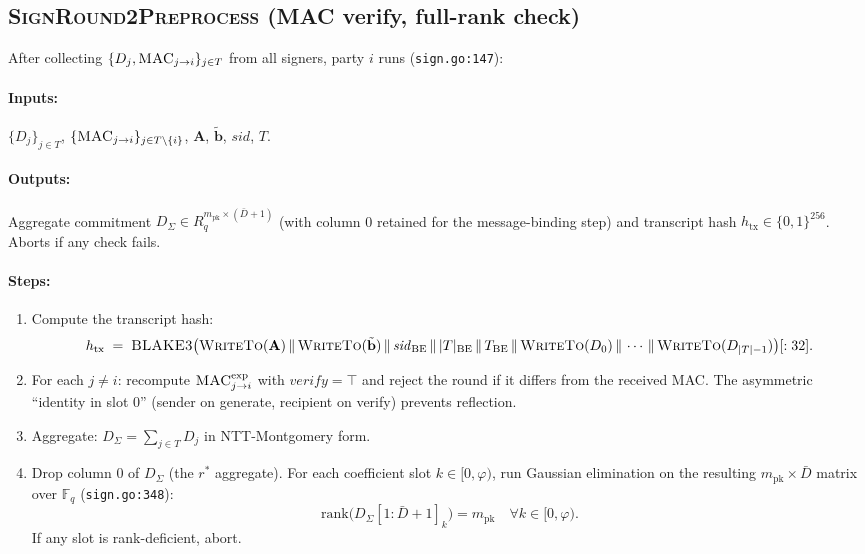 \subsection{\textsc{SignRound2Preprocess} (MAC verify, full-rank check)}
\label{sec:protocol:r2pre}

After collecting $\{D_j, \textsc{MAC}_{j \to i}\}_{j \in T}$ from all
signers, party $i$ runs (\texttt{sign.go:147}):

\paragraph{Inputs:} $\{D_j\}_{j \in T}$, $\{\textsc{MAC}_{j \to i}\}_{j
\in T \setminus \{i\}}$, $\mathbf{A}$, $\tilde{\mathbf{b}}$,
$\mathit{sid}$, $T$.

\paragraph{Outputs:} Aggregate commitment $D_\Sigma \in
R_q^{m_{\mathrm{pk}} \times (\bar D + 1)}$ (with column 0 retained
for the message-binding step) and transcript hash $h_{\mathrm{tx}} \in
\{0,1\}^{256}$. Aborts if any check fails.

\paragraph{Steps:}
\begin{enumerate}[leftmargin=2em, nosep]
\item Compute the transcript hash:
      \[
        h_{\mathrm{tx}}
        \;=\; \textsc{BLAKE3}\bigl(
          \textsc{WriteTo}(\mathbf{A}) \,\|\,
          \textsc{WriteTo}(\tilde{\mathbf{b}}) \,\|\,
          \mathit{sid}_{\mathrm{BE}} \,\|\,
          |T|_{\mathrm{BE}} \,\|\,
          T_{\mathrm{BE}} \,\|\,
          \textsc{WriteTo}(D_0) \,\|\, \cdots \,\|\,
          \textsc{WriteTo}(D_{|T|-1})
        \bigr)[:32].
      \]
\item For each $j \neq i$: recompute
      $\textsc{MAC}^{\mathrm{exp}}_{j \to i}$ with $\mathit{verify} =
      \top$ and reject the round if it differs from the received MAC.
      The asymmetric ``identity in slot 0'' (sender on generate,
      recipient on verify) prevents reflection.
\item Aggregate: $D_\Sigma = \sum_{j \in T} D_j$ in NTT-Montgomery form.
\item Drop column 0 of $D_\Sigma$ (the $r^*$ aggregate). For each
      coefficient slot $k \in [0, \varphi)$, run Gaussian elimination
      on the resulting $m_{\mathrm{pk}} \times \bar D$ matrix over
      $\mathbb{F}_q$ (\texttt{sign.go:348}):
      \[
        \mathrm{rank}\bigl( D_\Sigma[1:\bar D+1]_k \bigr) = m_{\mathrm{pk}}
        \quad \forall k \in [0, \varphi).
      \]
      If any slot is rank-deficient, abort.
\end{enumerate}

